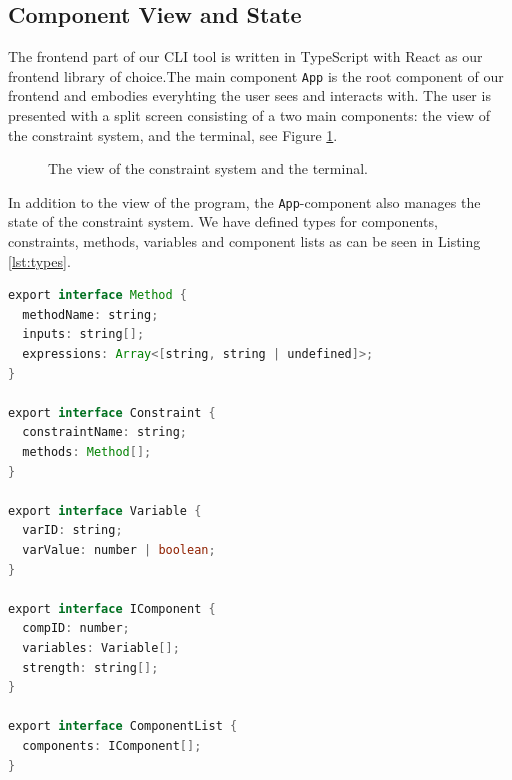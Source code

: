 \documentclass[11pt, a4paper]{article}
\begin{document}
\subsection{Component View and State}
\label{sec:componentview}
The frontend part of our CLI tool is written in TypeScript \cite{typescript} with React as our frontend library of choice.The main component \texttt{App} is the root component of our frontend and embodies everyhting the user sees and interacts with. The user is presented with a split screen consisting of a two main components: the view of the constraint system, and the terminal, see Figure \ref{fig:view}.

\begin{figure}[h]
    \centering
    \caption{The view of the constraint system and the terminal.}
    \label{fig:view}
\end{figure}

In addition to the view of the program, the \texttt{App}-component also manages the state of the constraint system. We have defined types for components, constraints, methods, variables and component lists as can be seen in Listing \ref{lst:types}.

\begin{lstlisting}[float, language=java, caption={Types for constraint systems.}, label={lst:types}]
export interface Method {
  methodName: string;
  inputs: string[];
  expressions: Array<[string, string | undefined]>;
}

export interface Constraint {
  constraintName: string;
  methods: Method[];
}

export interface Variable {
  varID: string;
  varValue: number | boolean;
}

export interface IComponent {
  compID: number;
  variables: Variable[];
  strength: string[];
}

export interface ComponentList {
  components: IComponent[];
}
\end{lstlisting}
\end{document}
